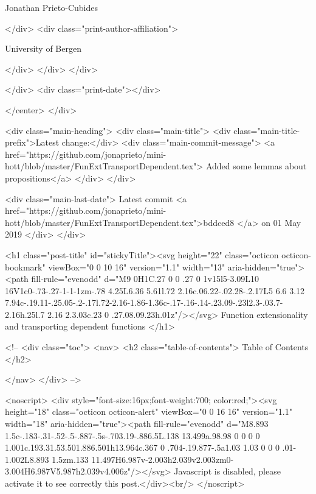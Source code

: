                   Jonathan Prieto-Cubides
                
              </div>
              <div class="print-author-affiliation">
                
                  University of Bergen
                
                </div>
            </div>
          </div>
          
          
        </div>
        <div class="print-date"></div>
        
        
    </center>
  </div>

  
  <div class="main-heading">
    <div class="main-title">
      <div class="main-title-prefix">Latest change:</div>
      <div class="main-commit-message">
            <a href="https://github.com/jonaprieto/mini-hott/blob/master/FunExtTransportDependent.tex">
              Added some lemmas about propositions</a>
      </div>
    </div>

    <div class="main-last-date">
      Latest commit <a href="https://github.com/jonaprieto/mini-hott/blob/master/FunExtTransportDependent.tex">bddced8 </a> on  01 May 2019
    </div>
  </div>
  
  <h1 class="post-title" id="stickyTitle"><svg height="22" class="octicon octicon-bookmark" viewBox="0 0 10 16" version="1.1" width="13" aria-hidden="true"><path fill-rule="evenodd" d="M9 0H1C.27 0 0 .27 0 1v15l5-3.09L10 16V1c0-.73-.27-1-1-1zm-.78 4.25L6.36 5.61l.72 2.16c.06.22-.02.28-.2.17L5 6.6 3.12 7.94c-.19.11-.25.05-.2-.17l.72-2.16-1.86-1.36c-.17-.16-.14-.23.09-.23l2.3-.03.7-2.16h.25l.7 2.16 2.3.03c.23 0 .27.08.09.23h.01z"/></svg> Function extensionality and transporting dependent functions 
  </h1>

  <!-- 
  <div class="toc">
    <nav>
    <h2 class="table-of-contents"> Table of Contents </h2>
      

    </nav>
  </div>
   -->

  <noscript>
  <div style="font-size:16px;font-weight:700; color:red;"><svg height="18" class="octicon octicon-alert" viewBox="0 0 16 16" version="1.1" width="18" aria-hidden="true"><path fill-rule="evenodd" d="M8.893 1.5c-.183-.31-.52-.5-.887-.5s-.703.19-.886.5L.138 13.499a.98.98 0 0 0 0 1.001c.193.31.53.501.886.501h13.964c.367 0 .704-.19.877-.5a1.03 1.03 0 0 0 .01-1.002L8.893 1.5zm.133 11.497H6.987v-2.003h2.039v2.003zm0-3.004H6.987V5.987h2.039v4.006z"/></svg> Javascript is disabled, please activate it to see correctly this post.</div><br/>
  </noscript>

